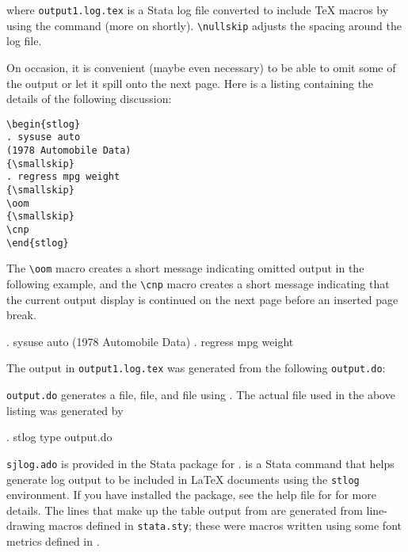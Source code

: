 \noindent
where \texttt{output1.log.tex} is a Stata log file converted to include \TeX{}
macros by using the  command (more on  shortly).
\verb+\nullskip+ adjusts the spacing around the log file.

\clearpage
On occasion, it is convenient (maybe even necessary) to be able to omit some of
the output or let it spill onto the next page.  Here is a listing containing
the details of the following discussion:

\begin{stverbatim}
\begin{verbatim}
\begin{stlog}
. sysuse auto
(1978 Automobile Data)
{\smallskip}
. regress mpg weight
{\smallskip}
\oom
{\smallskip}
\cnp
\end{stlog}
\end{verbatim}
\end{stverbatim}

The \verb+\oom+ macro creates
a short message indicating omitted output in the following example, and the
\verb+\cnp+ macro creates a short message indicating that the current output
display is continued on the next page before an inserted page break.

\begin{stlog}
. sysuse auto
(1978 Automobile Data)
{\smallskip}
. regress mpg weight
{\smallskip}
\oom
{\smallskip}
\cnp
\end{stlog}

The output in \texttt{output1.log.tex} was generated from the following
\texttt{output.do}:

\begin{stlog}

\end{stlog}

\noindent
\texttt{output.do} generates a  file,  file,
and  file using .  The actual file used in the
above listing was generated by

\begin{stlog}
. stlog type output.do
\end{stlog}

\texttt{sjlog.ado} is provided in the Stata package for .
 is a Stata command that helps generate log output to be included
in {\LaTeX} documents using the \texttt{stlog} environment.  If you have
installed the  package, see the help file for  for
more details.  The lines that make up the table output from 
are generated from line-drawing macros defined in \texttt{stata.sty}; these
were macros written using some font metrics defined in \citet{texbook}.

